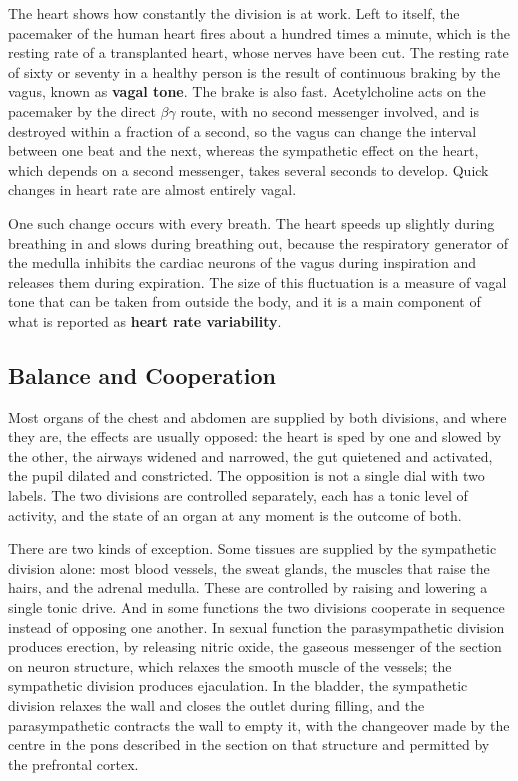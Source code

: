 \documentclass[11pt]{article}
\begin{document}
The heart shows how constantly the division is at work. Left to itself, the pacemaker of the human heart fires about a hundred times a minute, which is the resting rate of a transplanted heart, whose nerves have been cut. The resting rate of sixty or seventy in a healthy person is the result of continuous braking by the vagus, known as \textbf{vagal tone}. The brake is also fast. Acetylcholine acts on the pacemaker by the direct $\beta\gamma$ route, with no second messenger involved, and is destroyed within a fraction of a second, so the vagus can change the interval between one beat and the next, whereas the sympathetic effect on the heart, which depends on a second messenger, takes several seconds to develop. Quick changes in heart rate are almost entirely vagal.

One such change occurs with every breath. The heart speeds up slightly during breathing in and slows during breathing out, because the respiratory generator of the medulla inhibits the cardiac neurons of the vagus during inspiration and releases them during expiration. The size of this fluctuation is a measure of vagal tone that can be taken from outside the body, and it is a main component of what is reported as \textbf{heart rate variability}.

\subsection{Balance and Cooperation}

Most organs of the chest and abdomen are supplied by both divisions, and where they are, the effects are usually opposed: the heart is sped by one and slowed by the other, the airways widened and narrowed, the gut quietened and activated, the pupil dilated and constricted. The opposition is not a single dial with two labels. The two divisions are controlled separately, each has a tonic level of activity, and the state of an organ at any moment is the outcome of both.

There are two kinds of exception. Some tissues are supplied by the sympathetic division alone: most blood vessels, the sweat glands, the muscles that raise the hairs, and the adrenal medulla. These are controlled by raising and lowering a single tonic drive. And in some functions the two divisions cooperate in sequence instead of opposing one another. In sexual function the parasympathetic division produces erection, by releasing nitric oxide, the gaseous messenger of the section on neuron structure, which relaxes the smooth muscle of the vessels; the sympathetic division produces ejaculation. In the bladder, the sympathetic division relaxes the wall and closes the outlet during filling, and the parasympathetic contracts the wall to empty it, with the changeover made by the centre in the pons described in the section on that structure and permitted by the prefrontal cortex.
\end{document}
